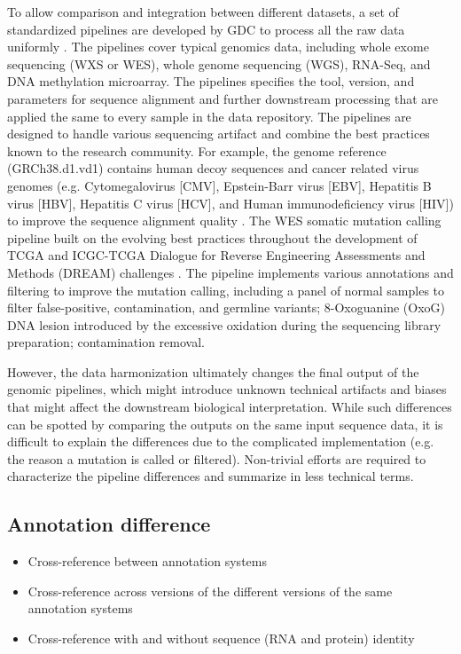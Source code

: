 To allow comparison and integration between different datasets, a set of standardized pipelines are developed by GDC to process all the raw data uniformly \cite{grossmanrl_staudtlm:SharedVision2016,zhangz_grossmanrl:UniformGenomic2021}. The pipelines cover typical genomics data, including whole exome sequencing (WXS or WES), whole genome sequencing (WGS), RNA-Seq, and DNA methylation microarray. The pipelines specifies the tool, version, and parameters for sequence alignment and further downstream processing that are applied the same to every sample in the data repository. The pipelines are designed to handle various sequencing artifact and combine the best practices known to the research community. For example, the genome reference (GRCh38.d1.vd1) contains human decoy sequences and cancer related virus genomes (e.g. Cytomegalovirus [CMV], Epstein-Barr virus [EBV], Hepatitis B virus [HBV], Hepatitis C virus [HCV], and Human immunodeficiency virus [HIV]) to improve the sequence alignment quality \cite{zhangz_grossmanrl:UniformGenomic2021}. The WES somatic mutation calling pipeline built on the evolving best practices throughout the development of TCGA and ICGC-TCGA Dialogue for Reverse Engineering Assessments and Methods (DREAM) challenges \cite{ewingad_boutrospc:CombiningTumor2015,ellrottk_tcga:MC3MutationCalling2018}. The pipeline implements various annotations and filtering to improve the mutation calling, including a panel of normal samples to filter false-positive, contamination, and germline variants; 8-Oxoguanine (OxoG) DNA lesion introduced by the excessive oxidation during the sequencing library preparation; contamination removal.

However, the data harmonization ultimately changes the final output of the genomic pipelines, which might introduce unknown technical artifacts and biases that might affect the downstream biological interpretation. While such differences can be spotted by comparing the outputs on the same input sequence data, it is difficult to explain the differences due to the complicated implementation (e.g. the reason a mutation is called or filtered). Non-trivial efforts are required to characterize the pipeline differences and summarize in less technical terms.


\subsection{Annotation difference}
\begin{itemize}
    \item Cross-reference between annotation systems
    \item Cross-reference across versions of the different versions of the same annotation systems
    \item Cross-reference with and without sequence (RNA and protein) identity
\end{itemize}

